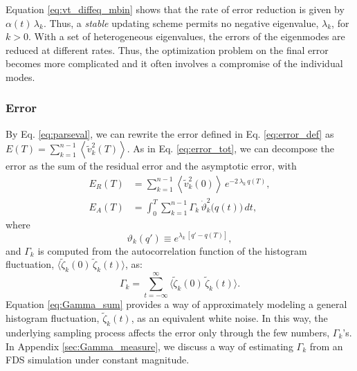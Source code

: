 \documentclass[reprint, superscriptaddress, floatfix]{revtex4-1}
\newcommand{\Err}{E}
\begin{document}
Equation \eqref{eq:vt_diffeq_mbin}
shows that the rate of error reduction
is given by $\alpha(t) \, \lambda_k$.
%
Thus, a \emph{stable} updating scheme
permits no negative eigenvalue, $\lambda_k$,
for $k > 0$.
%
With a set of heterogeneous eigenvalues,
the errors of the eigenmodes are reduced at different rates.
%
Thus, the optimization problem on the final error
becomes more complicated and it often
involves a compromise of the individual modes.



\subsubsection{Error}



By Eq. \eqref{eq:parseval},
we can rewrite the error defined in Eq. \eqref{eq:error_def} as
$\Err(T) = \sum_{k = 1}^{n - 1} \left\langle {\tilde v}_k^2(T) \right\rangle$.
%
%
As in Eq. \eqref{eq:error_tot},
we can decompose the error as the sum
of the residual error and the asymptotic error, with
\begin{align}
  \Err_R(T)
  &=
  \sum_{k = 1}^{n-1}
    \left\langle
      {\tilde v}_k^2(0)
    \right\rangle \,
    e^{ - 2 \, \lambda_k  \, q(T) }
  ,
  \label{eq:error_res}
  \\
  \Err_A(T)
  &=
  \int_0^T
  \sum_{k = 1}^{n-1}
  \Gamma_k \, \dot \vartheta_k^2\bigl( q(t) \bigr) \, dt
  ,
  \label{eq:error_asym}
\end{align}
%
where
%
\begin{equation}
  \vartheta_k(q') \equiv e^{\lambda_k \, [q' - q(T)]}
  ,
  \label{eq:uk_def}
\end{equation}
%
and $\Gamma_k$ is computed from
the autocorrelation function
of the histogram fluctuation,
$\bigl\langle {\tilde \zeta}_k(0)
\, {\tilde \zeta}_k(t) \bigr\rangle$,
as:
%
\begin{equation}
  \Gamma_k
  = \sum_{t = -\infty}^\infty
  \bigl\langle {\tilde \zeta}_k(0)
            \, {\tilde \zeta}_k(t) \bigr\rangle
  .
  \label{eq:Gamma_sum}
\end{equation}
%
%
Equation \eqref{eq:Gamma_sum} provides a way
of approximately modeling
a general histogram fluctuation, ${\tilde \zeta}_k(t)$,
as an equivalent white noise.
In this way,
the underlying sampling process
affects the error only through the
few numbers, $\Gamma_k$'s.
%
In Appendix \ref{sec:Gamma_measure},
we discuss a way of estimating $\Gamma_k$
from an FDS simulation under constant magnitude.
%
\end{document}
